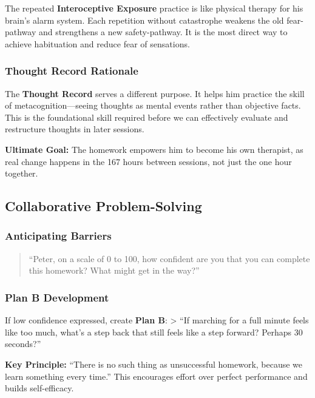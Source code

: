\documentclass[
  american,
  letterpaper,
  DIV=11,
  numbers=noendperiod]{scrartcl}
\begin{document}
The repeated \textbf{Interoceptive Exposure} practice is like physical
therapy for his brain's alarm system. Each repetition without
catastrophe weakens the old fear-pathway and strengthens a new
safety-pathway. It is the most direct way to achieve habituation and
reduce fear of sensations.

\subsubsection{Thought Record Rationale}\label{thought-record-rationale}

The \textbf{Thought Record} serves a different purpose. It helps him
practice the skill of metacognition---seeing thoughts as mental events
rather than objective facts. This is the foundational skill required
before we can effectively evaluate and restructure thoughts in later
sessions.

\textbf{Ultimate Goal:} The homework empowers him to become his own
therapist, as real change happens in the 167 hours between sessions, not
just the one hour together.

\subsection{Collaborative
Problem-Solving}\label{collaborative-problem-solving}

\subsubsection{Anticipating Barriers}\label{anticipating-barriers}

\begin{quote}
``Peter, on a scale of 0 to 100, how confident are you that you can
complete this homework? What might get in the way?''
\end{quote}

\subsubsection{Plan B Development}\label{plan-b-development}

If low confidence expressed, create \textbf{Plan B}: \textgreater{} ``If
marching for a full minute feels like too much, what's a step back that
still feels like a step forward? Perhaps 30 seconds?''

\textbf{Key Principle:} ``There is no such thing as unsuccessful
homework, because we learn something every time.'' This encourages
effort over perfect performance and builds self-efficacy.
\end{document}
